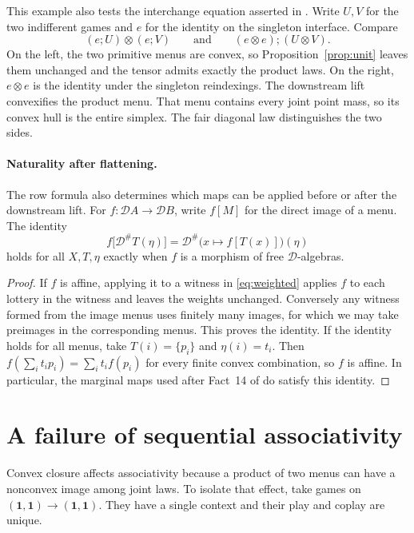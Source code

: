 \documentclass[11pt,a4paper]{article}
\theoremstyle{definition}
\newcommand{\D}{\mathcal D}
\newcommand{\one}{\mathbf 1}
\begin{document}
This example also tests the interchange equation asserted in \cite[Lemma~17]{gklf}. Write $U,V$ for the two indifferent games and $e$ for the identity on the singleton interface. Compare
\[
    (e;U)\otimes(e;V)
    \qquad\text{and}\qquad
    (e\otimes e);(U\otimes V).
\]
On the left, the two primitive menus are convex, so Proposition~\ref{prop:unit} leaves them unchanged and the tensor admits exactly the product laws. On the right, $e\otimes e$ is the identity under the singleton reindexings. The downstream lift convexifies the product menu. That menu contains every joint point mass, so its convex hull is the entire simplex. The fair diagonal law distinguishes the two sides.

\paragraph{Naturality after flattening.}

The row formula also determines which maps can be applied before or after the downstream lift. For $f:\D A\to\D B$, write $f[M]$ for the direct image of a menu. The identity
\[
    f\bigl[\D^\#T(\eta)\bigr]
    =\D^\#\bigl(x\mapsto f[T(x)]\bigr)(\eta)
\]
holds for all $X,T,\eta$ exactly when $f$ is a morphism of free $\D$-algebras.

\begin{proof}
    If $f$ is affine, applying it to a witness in \eqref{eq:weighted} applies $f$ to each lottery in the witness and leaves the weights unchanged. Conversely any witness formed from the image menus uses finitely many images, for which we may take preimages in the corresponding menus. This proves the identity. If the identity holds for all menus, take $T(i)=\{p_i\}$ and $\eta(i)=t_i$. Then $f(\sum_i t_ip_i)=\sum_i t_if(p_i)$ for every finite convex combination, so $f$ is affine. In particular, the marginal maps used after Fact~14 of \cite{gklf} do satisfy this identity.
\end{proof}

\section{A failure of sequential associativity}\label{sec:assoc}

Convex closure affects associativity because a product of two menus can have a nonconvex image among joint laws. To isolate that effect, take games on $(\one,\one)\to(\one,\one)$. They have a single context and their play and coplay are unique.
\end{document}
